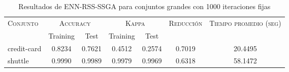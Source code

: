\begin{table}[]
\centering
\begin{tabular}{l c c c c c c}
\hline
\multirow{2}{*}{\textsc{Conjunto}}
	& \multicolumn{2}{c}{\textsc{Accuracy}}
	& \multicolumn{2}{c}{\textsc{Kappa}}
	& \textsc{Reducción}
	& \textsc{Tiempo promedio (seg)} \\
	& Training & Test
	& Training & Test \\ 
\hline
\hline

credit-card & 0.8234 & 0.7621 & 0.4512 & 0.2574 & 0.7019 & 20.4495 \\
shuttle & 0.9990 & 0.9989 & 0.9979 & 0.9969 & 0.6318 & 58.1472 \\

\hline
\end{tabular}
\caption{Resultados de ENN-RSS-SSGA para conjuntos grandes con 1000 iteraciones fijas}
\label{res-grande-ENN-RSS-ssga}
\end{table}

\clearpage


